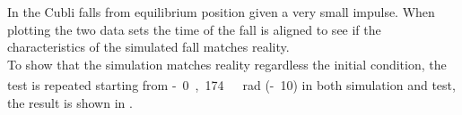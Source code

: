 \begin{minipage}{\linewidth}
\begin{minipage}{0.5\linewidth}
\begin{figure}[H]
			\centering
			\captionsetup{justification=centering}
			\label{FallTestComparison10deg}
		\end{figure}%
	\end{minipage}
\end{minipage}

In  the Cubli falls from equilibrium position given a very small impulse. When plotting the two data sets the time of the fall is aligned to see if the characteristics of the simulated fall matches reality.\\
To show that the simulation matches reality regardless the initial condition, the test is repeated starting from \si{-0,174\ rad} (\si{-10^\circ}) in both simulation and test, the result is shown in .

